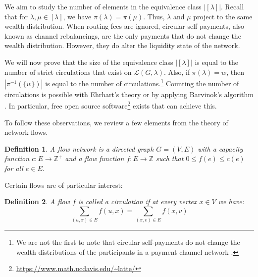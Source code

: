\documentclass[10pt,twocolumn]{article}
\newtheorem{definition}{Definition}[section]
\begin{document}
We aim to study the number of elements in the equivalence class \( |[\lambda]| \).  
Recall that for \( \lambda, \mu \in [\lambda] \), we have \( \pi(\lambda) = \pi(\mu) \).  
Thus, \( \lambda \) and \( \mu \) project to the same wealth distribution.  
When routing fees are ignored, circular self-payments, also known as channel rebalancings, are the only payments that do not change the wealth distribution.  
However, they do alter the liquidity state of the network.  

We will now prove that the size of the equivalence class \( |[\lambda]| \) is equal to the number of strict circulations that exist on \( \mathcal{L}(G, \lambda) \).  
Also, if \( \pi(\lambda) = w \), then \( |\pi^{-1}(\{w\})| \) is equal to the number of circulations.\footnote{We are not the first to note that circular self-payments do not change the wealth distributions of the participants in a payment channel network \cite{piatkivskyi2018rebalancing}.}  
Counting the number of circulations is possible with Ehrhart's theory \cite{ehrhart1962polyhedra} or by applying Barvinok's algorithm \cite{barvinok1994polynomial}.  
In particular, free open source software\footnote{\url{https://www.math.ucdavis.edu/~latte/}} exists \cite{de2004effective} that can achieve this.  

To follow these observations, we review a few elements from the theory of network flows.  

\begin{definition}
A flow network is a directed graph \( G = (V, E) \) with a capacity function \( c: E \rightarrow \mathbb{Z}^+ \) and a flow function \( f: E \rightarrow \mathbb{Z} \) such that \( 0 \leq f(e) \leq c(e) \) for all \( e \in E \).
\end{definition}

Certain flows are of particular interest:  

\begin{definition}
A flow \( f \) is called a circulation if at every vertex \( x \in V \) we have:
\begin{equation}
\sum_{(u,x) \in E} f(u,x) = \sum_{(x,v) \in E} f(x,v)
\end{equation}
\end{definition}


\end{document}
